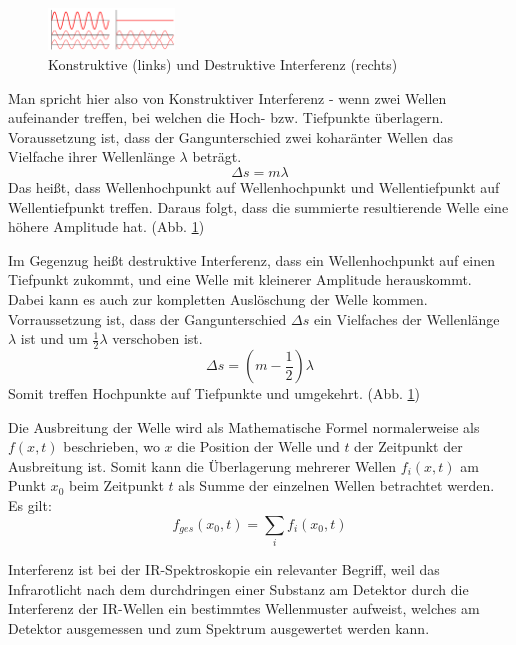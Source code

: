 \documentclass{article}
\begin{document}
\begin{figure}
    \centering
    \includegraphics[width=0.3\textwidth]{interferenz.png}
    \caption{Konstruktive (links) und Destruktive Interferenz (rechts)}
    \label{fig:interferenz}
\end{figure}
Man spricht hier also von Konstruktiver Interferenz - wenn zwei Wellen aufeinander treffen, bei welchen die Hoch- bzw. Tiefpunkte überlagern. Voraussetzung ist, dass der Gangunterschied zwei koharänter Wellen das Vielfache ihrer Wellenlänge $\lambda$ beträgt.
\begin{equation}
    \Delta s = m \lambda
\end{equation}
Das heißt, dass Wellenhochpunkt auf Wellenhochpunkt und Wellentiefpunkt auf Wellentiefpunkt treffen. Daraus folgt, dass die summierte resultierende Welle eine höhere Amplitude hat. (Abb. \ref{fig:interferenz})

Im Gegenzug heißt destruktive Interferenz, dass ein Wellenhochpunkt auf einen Tiefpunkt zukommt, und eine Welle mit kleinerer Amplitude herauskommt. Dabei kann es auch zur kompletten Auslöschung der Welle kommen. Vorraussetzung ist, dass der Gangunterschied $\Delta s$ ein Vielfaches der Wellenlänge $\lambda$ ist und um $\frac{1}{2} \lambda$ verschoben ist.
\begin{equation}
    \Delta s = (m - \frac{1}{2}) \lambda
\end{equation}
Somit treffen Hochpunkte auf Tiefpunkte und umgekehrt. (Abb. \ref{fig:interferenz})

Die Ausbreitung der Welle wird als Mathematische Formel normalerweise als $f(x, t)$ beschrieben, wo $x$ die Position der Welle und $t$ der Zeitpunkt der Ausbreitung ist. Somit kann die Überlagerung mehrerer Wellen $f_i(x, t)$ am Punkt $x_0$ beim Zeitpunkt $t$ als Summe der einzelnen Wellen betrachtet werden. Es gilt:
\begin{equation}
    f_{ges}(x_0, t) = \sum_{i}f_i(x_0, t)
\end{equation}

Interferenz ist bei der IR-Spektroskopie ein relevanter Begriff, weil das Infrarotlicht nach dem durchdringen einer Substanz am Detektor durch die Interferenz der IR-Wellen ein bestimmtes Wellenmuster aufweist, welches am Detektor ausgemessen und zum Spektrum ausgewertet werden kann. 
\end{document}
